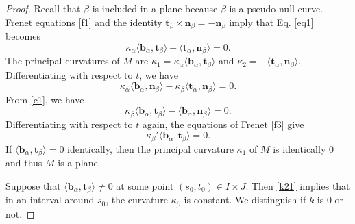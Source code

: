 \documentclass[a4paper,12pt]{amsart}
\numberwithin{equation}{section}
\theoremstyle{definition}
\def\t{\mathbf t}
\def\n{\mathbf n}
\def\b{\mathbf b}
\begin{document}
\begin{proof}
Recall that $\beta$ is included in a plane because $\beta$ is a pseudo-null curve. Frenet equations \eqref{f1} and the identity  $\t_\beta\times\n_\beta=-\n_\beta$ imply that Eq. \eqref{eq1} becomes
\begin{equation}\label{c1}\kappa_\alpha\langle \b_\alpha,\t_\beta\rangle-\langle\t_\alpha,\n_\beta\rangle=0.
\end{equation}
The principal curvatures of $M$ are $\kappa_1=\kappa_\alpha\langle \b_\alpha,\t_\beta\rangle$ and $\kappa_2=-\langle\t_\alpha,\n_\beta\rangle$. Differentiating with respect to  $t$, we have
$$\kappa_\alpha\langle\b_\alpha,\n_\beta\rangle-\kappa_\beta\langle\t_\alpha,\n_\beta\rangle=0.$$
From   \eqref{c1}, we have 
\begin{equation}\label{c11}
\kappa_\beta\langle\b_\alpha,\t_\beta\rangle-\langle\b_\alpha,\n_\beta\rangle=0.
\end{equation}
Differentiating with respect to $t$ again, the equations of Frenet \eqref{f3} give
\begin{equation}\label{k21}\kappa_\beta'\langle\b_\alpha,\t_\beta\rangle=0.
\end{equation}
If $\langle\b_\alpha,\t_\beta\rangle=0$ identically, then the principal curvature $\kappa_1$ of $M$ is identically $0$ and   thus $M$ is a plane. 

Suppose that  $\langle\b_\alpha,\t_\beta\rangle\not=0$ at some point $(s_0,t_0)\in I\times J$. Then \eqref{k21} implies that  in an interval around $s_0$, the curvature $\kappa_\beta$ is constant.   We distinguish if $k$ is $0$ or not.
 

\end{proof}
\end{document}
